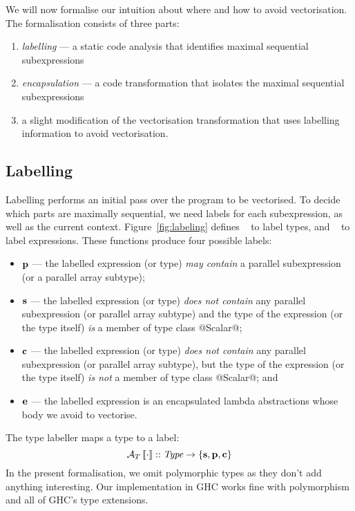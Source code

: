 %
We will now formalise our intuition about where and how to avoid vectorisation. The formalisation consists of three parts:
\begin{enumerate}
\item   \emph{labelling} --- a static code analysis that identifies maximal sequential subexpressions
\item   \emph{encapsulation} --- a code transformation that isolates the maximal sequential subexpressions
\item   a slight modification of the vectorisation transformation that uses labelling information to avoid vectorisation.
\end{enumerate}


\subsection{Labelling}

Labelling performs an initial pass over the program to be vectorised. To decide which parts are maximally sequential, we need labels for each subexpression, as well as the current context. Figure~\ref{fig:labeling} defines \AT\cdot ~ to label types, and \AV\cdot\cdot ~ to label expressions. These functions produce four possible labels:
%
\begin{itemize}
\item $\mathbf{p}$ --- the labelled expression (or type) \emph{may contain} a parallel subexpression (or a parallel array subtype);

\item $\mathbf{s}$ --- the labelled expression (or type) \emph{does not contain} any parallel subexpression (or parallel array subtype) and 
the type of the expression (or the type itself) \emph{is} a member of type class @Scalar@;

\item $\mathbf{c}$ --- the labelled expression (or type) \emph{does not contain} any parallel subexpression (or parallel array subtype), but the type of the expression (or the type itself) \emph{is not} a member of type class @Scalar@; and

\item $\mathbf{e}$ --- the labelled expression is an encapsulated lambda abstractions whose body we avoid to vectorise.
\end{itemize}

\eject
\noindent
The type labeller maps a type to a label:
\[
\mathcal{A}_T\left\llbracket \cdot \right\rrbracket :: \textit{Type} \to \{\mathbf{s}, \mathbf{p}, \mathbf{c}\} 
\]
In the present formalisation, we omit polymorphic types as they don't add anything interesting. Our implementation in GHC works fine with polymorphism and all of GHC's type extensions.

